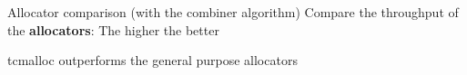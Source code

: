 \documentclass[xcolor=x11names,compress]{beamer}
\renewcommand{\(}{\begin{columns}}
\renewcommand{\)}{\end{columns}}
\newcommand{\<}[1]{\begin{column}{#1}}
\renewcommand{\>}{\end{column}}
\begin{document}

\begin{frame}{Allocator comparison (with the combiner algorithm)}
	Compare the throughput of the \textbf{allocators}: The higher the better
	\begin{figure}[t]
    \begin{center}
	\end{center}
	\end{figure}

	tcmalloc outperforms the general purpose allocators
\end{frame}


\end{document}
